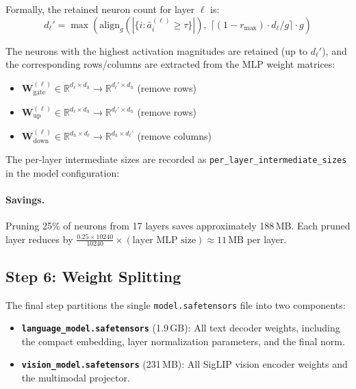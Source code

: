 \documentclass[11pt]{article}
\newcommand{\RR}{\mathbb{R}}
\begin{document}
Formally, the retained neuron count for layer $\ell$ is:
\begin{equation}
    d_\ell' = \max\left(\text{align}_g(|\{i : \bar{a}_i^{(\ell)} \geq \tau\}|), \; \lceil (1 - r_{\max}) \cdot d_\ell / g \rceil \cdot g \right)
\end{equation}

The neurons with the highest activation magnitudes are retained (up to $d_\ell'$), and the corresponding rows/columns are extracted from the MLP weight matrices:

\begin{itemize}[leftmargin=*]
    \item $\mathbf{W}_{\text{gate}}^{(\ell)} \in \RR^{d_\ell \times d_h} \rightarrow \RR^{d_\ell' \times d_h}$ (remove rows)
    \item $\mathbf{W}_{\text{up}}^{(\ell)} \in \RR^{d_\ell \times d_h} \rightarrow \RR^{d_\ell' \times d_h}$ (remove rows)
    \item $\mathbf{W}_{\text{down}}^{(\ell)} \in \RR^{d_h \times d_\ell} \rightarrow \RR^{d_h \times d_\ell'}$ (remove columns)
\end{itemize}

The per-layer intermediate sizes are recorded as \texttt{per\_layer\_intermediate\_sizes} in the model configuration:
\begin{equation}
    [\underbrace{10240, \ldots, 10240}_{14}, \underbrace{7680, \ldots, 7680}_{17}]
\end{equation}

\paragraph{Savings.} Pruning 25\% of neurons from 17 layers saves approximately 188\,MB. Each pruned layer reduces by $\frac{0.25 \times 10240}{10240} \times (\text{layer MLP size}) \approx 11$\,MB per layer.

\subsection{Step 6: Weight Splitting}
\label{sec:split}

The final step partitions the single \texttt{model.safetensors} file into two components:

\begin{itemize}[leftmargin=*]
    \item \textbf{\texttt{language\_model.safetensors}} (1.9\,GB): All text decoder weights, including the compact embedding, layer normalization parameters, and the final norm.
    \item \textbf{\texttt{vision\_model.safetensors}} (231\,MB): All SigLIP vision encoder weights and the multimodal projector.
\end{itemize}
\end{document}
